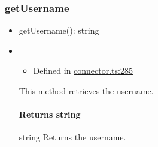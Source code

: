 \documentclass[]{article}
\providecommand{\tightlist}{%
  \setlength{\itemsep}{0pt}\setlength{\parskip}{0pt}}
\let\oldparagraph\paragraph
\renewcommand{\paragraph}[1]{\oldparagraph{#1}\mbox{}}
\begin{document}
\protect\hypertarget{getusername}{}{}

\hypertarget{getusername}{%
\subsubsection{getUsername}\label{getusername}}

\begin{itemize}
\tightlist
\item
  getUsername{(}{)}{: }{string}
\end{itemize}

\begin{itemize}
\item
  \begin{itemize}
  \tightlist
  \item
    Defined in
    \href{https://github.com/BFMBFramework/TadoConnector/blob/f05932b/src/connector.ts\#L285}{connector.ts:285}
  \end{itemize}

  This method retrieves the username.

  \hypertarget{returns-string-2}{%
  \paragraph{\texorpdfstring{Returns
  {string}}{Returns string}}\label{returns-string-2}}

  string Returns the username.
\end{itemize}
\end{document}
